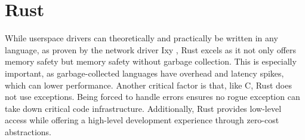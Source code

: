 

\section{Rust}
While userspace drivers can theoretically and practically be written in any language, as proven by the network driver Ixy \cite{ixylanggithub}, Rust excels as it not only offers memory safety but memory safety without garbage collection. This is especially important, as garbage-collected languages have overhead and latency spikes, which can lower performance. Another critical factor is that, like C, Rust does not use exceptions. Being forced to handle errors ensures no rogue exception can take down critical code infrastructure.
Additionally, Rust provides low-level access while offering a high-level development experience through zero-cost abstractions.